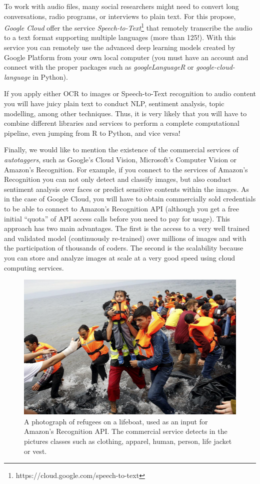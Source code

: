 To work with audio files, many social researchers might need to convert long conversations, radio programs, or interviews to plain text. For this propose, \textit{Google Cloud} offer the service \textit{Speech-to-Text}\footnote{https://cloud.google.com/speech-to-text}  that remotely transcribe the audio to a text format supporting multiple languages (more than 125!). With this service you can remotely use the advanced deep learning models created by Google Platform from your own local computer (you must have an account and connect with the proper packages such as \emph{googleLanguageR} or \emph{google-cloud-language} in Python).

If you apply either OCR to images or Speech-to-Text recognition to audio content you will have juicy plain text to conduct NLP, sentiment analysis, topic modelling, among other techniques.  Thus, it is very likely that you will have to combine different libraries and services to perform a complete computational pipeline, even jumping from R to Python, and vice versa!

Finally, we would like to mention the existence of the commercial services of \textit{autotaggers}, such as Google's Cloud Vision, Microsoft's Computer Vision or Amazon's Recognition. For example, if you connect to the services of Amazon's Recognition you can not only detect and classify images, but also conduct sentiment analysis over faces or predict sensitive contents within the images. As in the case of Google Cloud, you will have to obtain commercially sold credentials to be able to connect to Amazon's Recognition API (although you get  a free initial  ``quota'' of API access calls before you need to pay for usage). This approach has two main advantages. The first is the access to a very well trained and validated model (continuously re-trained) over millions of images and with the participation of thousands of coders. The second is the scalability because you can store and analyze images at scale at a very good speed using cloud computing services.

\begin{figure}
\centering
\includegraphics[width=0.9\linewidth]{figures/ch15_refugees.png}
\caption{A photograph of refugees on a lifeboat, used as an input for Amazon's Recognition API. The commercial service detects in the pictures classes such as clothing, apparel, human, person, life jacket or vest.}
\label{fig:refugees}
\end{figure}


